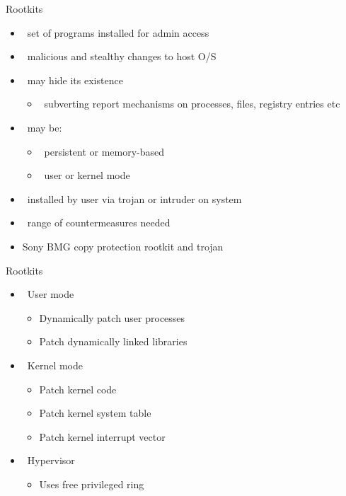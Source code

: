 \documentclass{beamer}
\begin{document}
\begin{frame}{Rootkits}
  \begin{itemize}
  \item  set of programs installed for admin access 
  \item  malicious and stealthy changes to host O/S 
  \item  may hide its existence 
    \begin{itemize}
    \item  subverting report mechanisms on processes, files, registry entries 
      etc 
    \end{itemize}
  \item  may be: 
    \begin{itemize}
    \item  persistent or memory-based 
    \item  user or kernel mode 
    \end{itemize}
  \item  installed by user via trojan or intruder on system 
  \item  range of countermeasures needed
  \item Sony BMG copy protection rootkit and trojan
  \end{itemize}
\end{frame}

\begin{frame}{Rootkits}
  \begin{itemize}
  \item  User mode
  \begin{itemize}
    \item Dynamically patch user processes
    \item Patch dynamically linked libraries
  \end{itemize}
  \item  Kernel mode
  \begin{itemize}
    \item Patch kernel code
    \item Patch kernel system table
    \item Patch kernel interrupt vector
  \end{itemize}
  \item  Hypervisor
  \begin{itemize}
    \item Uses free privileged ring
  \end{itemize}
  \end{itemize}
\end{frame}
\end{document}
